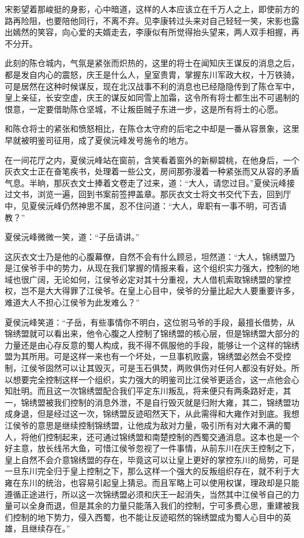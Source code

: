 宋影望着那峻挺的身影，心中暗道，这样的人本应该立在千万人之上，即使前方的路再险阻，也要陪他同行，不离不弃。见李康转过头来对自己轻轻一笑，宋影也露出嫣然的笑容，向心爱的夫婿走去，李康似有所觉得抬头望来，两人双手相握，再不分开。

此刻的陈仓城内，气氛是紧张而炽热的，这里的将士在闻知庆王谋反的消息之后，都是发自内心的震怒，庆王是什么人，皇室贵胄，掌握东川军政大权，十万铁骑，可是居然在这种时候谋反，现在北汉战事不利的消息也已经隐隐传到了陈仓军中，皇上亲征，长安空虚，庆王的谋反如同雪上加霜，这令所有将士都生出不可遏制的恨意，一定要借助陈仓坚城，不让叛臣贼子东进一步，这是所有将士的心愿。

和陈仓将士的紧张和愤怒相比，在陈仓太守府的后宅之中却是一番从容景象，这里早就被明鉴司征用，成了夏侯沅峰发号施令的地方。

在一间花厅之内，夏侯沅峰站在窗前，含笑看着窗外的新柳碧桃，在他身后，一个灰衣文士正在奋笔疾书，处理着一些公文，房间那弥漫着一种紧张而又从容的矛盾气息。半晌，那灰衣文士捧着文卷走了过来，道：“大人，请您过目。”夏侯沅峰接过文书，浏览一遍，回到书案前签押盖章。那灰衣文士将文书交代下去，回到厅中，见夏侯沅峰仍然神思不属，忍不住问道：“大人，卑职有一事不明，可否请教？”

夏侯沅峰微微一笑，道：“子岳请讲。”

这灰衣文士乃是他的心腹幕僚，自然不会有什么顾忌，坦然道：“大人，锦绣盟乃是江侯爷手中的势力，从现在我们掌握的情报来看，这个组织实力强大，控制的地域也很广阔，无论如何，江侯爷必定对其十分重视，大人借机索取锦绣盟的掌控权，岂不是大大得罪了江侯爷。在皇上心目中，侯爷的分量比起大人要重要许多，难道大人不担心江侯爷为此发难么？”

夏侯沅峰笑道：“子岳，有些事情你不明白，这位驸马爷的手段，最擅长借势，从锦绣盟就可以看出来，他令心腹之人控制了锦绣盟的核心层，但是锦绣盟大部分的力量还是由心存反意的蜀人构成，我不得不佩服他的手段，能够让一个这样的锦绣盟为其所用。可是这样一来也有一个坏处，一旦事机败露，锦绣盟必然会不受控制，江侯爷固然可以让其毁灭，可是玉石俱焚，两败俱伤对任何人都没有好处。所以想要完全控制这样一个组织，实力强大的明鉴司比江侯爷更适合，这一点他会心知肚明。而且这一次锦绣盟配合我们平定东川叛乱，将来便只有两条路好走，其一，锦绣盟被我们控制的消息外泄，不是自行毁灭就是归附大雍，其二，锦绣盟功成身退，但是经过这一次，锦绣盟反迹昭然天下，从此需得和大雍作对到底。我想江侯爷的意思是继续控制锦绣盟，让他成为敌对力量，吸引所有对大雍不满的蜀人，将他们控制起来，还可通过锦绣盟和南楚控制的西蜀交通消息。这本也是一个好主意，放长线吊大鱼，可惜江侯爷忽视了一件事情，从前东川在庆王控制之下，皇上自然不会介意锦绣盟的存在，毕竟这可以让皇上更好的掌控东川的局势，可是一旦东川完全归于皇上控制之下，那么这样一个强大的反叛组织存在，就不利于大雍在东川的统治，也容易引起皇上猜忌。而且军略上可以使用权谋，理政却是只能遵循正途进行，所以这一次锦绣盟必须和庆王一起消失，当然其中江侯爷自己的力量可以全身而退，但是其余的力量只能落入我们的控制，宁可多费心思，重建被我们控制的地下势力，侵入西蜀，也不能让反迹昭然的锦绣盟成为蜀人心目中的英雄，且继续存在。”

